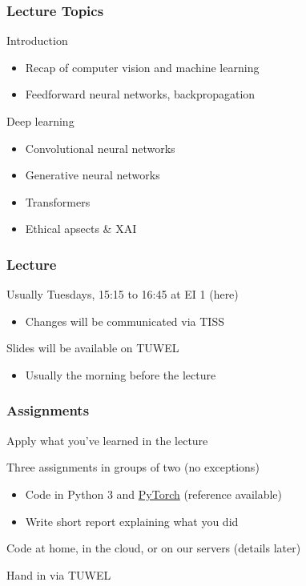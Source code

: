 \documentclass[xetex,professionalfont]{beamer}
\begin{document}
\begin{frame}
\frametitle{Lecture Topics}

Introduction
\begin{itemize}
    \item Recap of computer vision and machine learning
    \item Feedforward neural networks, backpropagation
\end{itemize}

\bigskip

Deep learning
\begin{itemize}
    \item Convolutional neural networks
    \item Generative neural networks
    \item Transformers
    \item Ethical apsects \& XAI
\end{itemize}

\end{frame}


\begin{frame}
  \frametitle{Lecture}
  Usually Tuesdays, 15:15 to 16:45 at EI 1 (here)
  \begin{itemize}
    \item Changes will be communicated via TISS
  \end{itemize}
  \bigskip
  Slides will be available on TUWEL
  \begin{itemize}
    \item Usually the morning before the lecture
  \end{itemize}
\end{frame}


\begin{frame}
  \frametitle{Assignments}
  Apply what you've learned in the lecture

  \bigskip
  Three assignments in groups of two (no exceptions)
  \begin{itemize}
    \item Code in Python 3 and \href{https://pytorch.org/}{PyTorch} (reference available)
    \item Write short report explaining what you did
  \end{itemize}

  \bigskip
  Code at home, in the cloud, or on our servers (details later)

  \bigskip
  Hand in via TUWEL
\end{frame}
\end{document}
